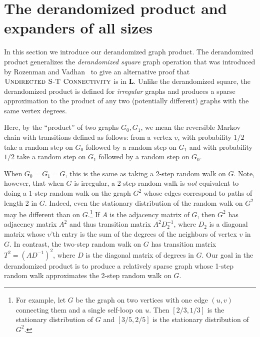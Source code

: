 \documentclass[11pt]{article}
\numberwithin{equation}{section}
\theoremstyle{definition}
\theoremstyle{plain}
\newcommand{\class}[1]{\mathbf{#1}}
\renewcommand{\L}{\class{L}}
\def\textprob#1{\textmd{\textsc{#1}}}
\newcommand{\USTConn}{\textprob{Undirected S-T Connectivity}}
\numberwithin{myalgctr}{section}
\theoremstyle{named}
\begin{document}
%

\section{The derandomized product and expanders of all sizes}
\label{sect:expanders}

In this section we introduce our derandomized graph product. The derandomized product generalizes the \emph{derandomized square} graph operation that was introduced by Rozenman and Vadhan~\cite{RozenmanVa05} to give an alternative proof that $\USTConn$ is in $\L$. Unlike the derandomized square, the derandomized product is defined for \emph{irregular} graphs and produces a sparse approximation to the product of any two (potentially different) graphs with the same vertex degrees.

Here, by the ``product'' of two graphs $G_0,G_1$, we mean the reversible Markov chain with transitions defined as follows: from a vertex $v$, with probability $1/2$ take a random step on $G_0$ followed by a random step on $G_1$ and with probability $1/2$ take a random step on $G_1$ followed by a random step on $G_0$. 

When $G_0=G_1=G$, this is the same as taking a 2-step random walk on $G$. Note, however, that when $G$ is irregular, a 2-step random walk is \emph{not} equivalent to doing a 1-step random walk on the graph $G^2$ whose edges correspond to paths of length 2 in $G$. Indeed, even the stationary distribution of the random walk on $G^2$ may be different than on $G$.\footnote{For example, let $G$ be the graph on two vertices with one edge $(u,v)$ connecting them and a single self-loop on $u$. Then $[2/3,1/3]$ is the stationary distribution of $G$ and $[3/5,2/5]$ is the stationary distribution of $G^2$.} If $A$ is the adjacency matrix of $G$, then $G^2$ has adjacency matrix $A^2$ and thus transition matrix
$A^2D_2^{-1}$, where $D_2$ is a diagonal matrix whose $v$'th entry is the sum of the degrees of the neighbors of vertex $v$ in $G$.  In contrast, the two-step random walk on $G$ has transition matrix $T^2=(AD^{-1})^2$, where $D$ is the diagonal matrix of degrees in $G$.
%
Our goal in the derandomized product is to produce a relatively sparse graph whose 1-step random walk approximates the 2-step random walk on $G$. 
\end{document}
